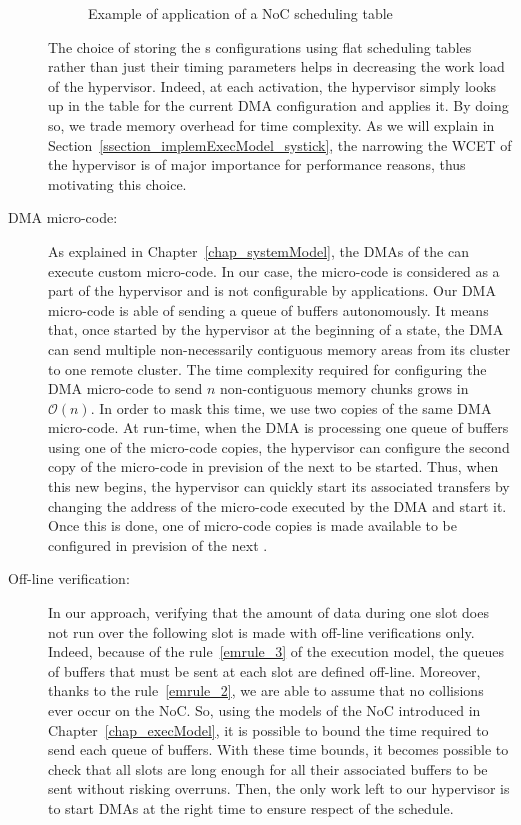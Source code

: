 \documentclass[main.tex]{subfiles}
\begin{document}
\begin{description}
\begin{example}
            \begin{figure}
                \centering
                \scalebox{1}{}
                \caption{Example of application of a NoC scheduling table}
                \label{fig_implemExecModel_exNoCSchedule}
            \end{figure}
        \end{example}
        The choice of storing the \PC{}s configurations using flat scheduling tables rather than just their timing parameters helps in decreasing the work load of the hypervisor. Indeed, at each activation, the hypervisor simply looks up in the table for the current DMA configuration and applies it. By doing so, we trade memory overhead for time complexity. As we will explain in Section~\ref{ssection_implemExecModel_systick}, the narrowing the WCET of the hypervisor is of major importance for performance reasons, thus motivating this choice.


    \item[DMA micro-code: ] As explained in Chapter~\ref{chap_systemModel}, the DMAs of the \mppalong can execute custom micro-code. In our case, the micro-code is considered as a part of the hypervisor and is not configurable by applications. Our DMA micro-code is able of sending a queue of buffers autonomously. It means that, once started by the hypervisor at the beginning of a \PC{} state, the DMA can send multiple non-necessarily contiguous memory areas from its cluster to one remote cluster. The time complexity required for configuring the DMA micro-code to send $n$ non-contiguous memory chunks grows in $\mathcal{O}(n)$. In order to mask this time, we use two copies of the same DMA micro-code. At run-time, when the DMA is processing one queue of buffers using one of the micro-code copies, the hypervisor can configure the second copy of the micro-code in prevision of the next \PC{} to be started. Thus, when this new \PC{} begins, the hypervisor can quickly start its associated transfers by changing the address of the micro-code executed by the DMA and start it. Once this is done, one of micro-code copies is made available to be configured in prevision of the next \PC{}.

    \item[Off-line verification: ] In our approach, verifying that the amount of data during one \PC{} slot does not run over the following \PC{} slot is made with off-line verifications only. Indeed, because of the rule~\ref{emrule_3} of the execution model, the queues of buffers that must be sent at each \PC{} slot are defined off-line. Moreover, thanks to the rule~\ref{emrule_2}, we are able to assume that no collisions ever occur on the NoC. So, using the models of the NoC introduced in Chapter~\ref{chap_execModel}, it is possible to bound the time required to send each queue of buffers. With these time bounds, it becomes possible to check that all \PC{} slots are long enough for all their associated buffers to be sent without risking overruns. Then, the only work left to our hypervisor is to start DMAs at the right time to ensure respect of the schedule.


\end{description}
\end{document}
